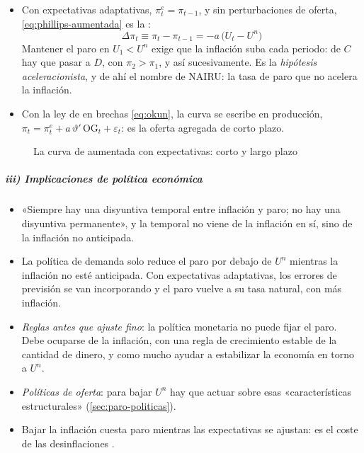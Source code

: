\documentclass[11pt]{article}
\begin{document}
\begin{itemize}
\begin{itemize}
  \item al ver que su salario real no ha subido, los trabajadores revisan sus expectativas, $\pi^e=\pi_1$, y piden más salario nominal: el salario real vuelve a su nivel y el paro, a $U^n$, con más inflación que al principio (punto $C$).
  \end{itemize}
  La curva de largo plazo, en la que $\pi=\pi^e$, es \emph{vertical} en $U^n$. Como no se puede estar en misa y repicando, a largo plazo no se tiene a la vez menos paro y la misma inflación.
\item Con expectativas adaptativas, $\pi^e_t=\pi_{t-1}$, y sin perturbaciones de oferta, \eqref{eq:phillips-aumentada} es la :
  \begin{equation}
  \Delta\pi_t\equiv\pi_t-\pi_{t-1}=-a\,\big(U_t-U^n\big) \label{eq:aceleracionista}
  \end{equation}
  Mantener el paro en $U_1<U^n$ exige que la inflación suba cada periodo: de $C$ hay que pasar a $D$, con $\pi_2>\pi_1$, y así sucesivamente. Es la \emph{hipótesis aceleracionista}, y de ahí el nombre de NAIRU: la tasa de paro que no acelera la inflación.
\item Con la ley de  en brechas \eqref{eq:okun}, la curva se escribe en producción, $\pi_t=\pi^e_t+a\,\vartheta'\,\mathrm{OG}_t+\varepsilon_t$: es la oferta agregada de corto plazo.
\end{itemize}

\begin{figure}[H]
\centering
\caption{La curva de  aumentada con expectativas: corto y largo plazo}\label{fig:phillips-aumentada}
\end{figure}

\subparagraph{iii) Implicaciones de política económica}

\begin{itemize}
\item «Siempre hay una disyuntiva temporal entre inflación y paro; no hay una disyuntiva permanente», y la temporal no viene de la inflación en sí, sino de la inflación no anticipada\nocite{Friedman1968Role}.
\item La política de demanda solo reduce el paro por debajo de $U^n$ mientras la inflación no esté anticipada. Con expectativas adaptativas, los errores de previsión se van incorporando y el paro vuelve a su tasa natural, con más inflación.
\item \emph{Reglas antes que ajuste fino}: la política monetaria no puede fijar el paro. Debe ocuparse de la inflación, con una regla de crecimiento estable de la cantidad de dinero, y como mucho ayudar a estabilizar la economía en torno a $U^n$.
\item \emph{Políticas de oferta}: para bajar $U^n$ hay que actuar sobre esas «características estructurales» (\ref{sec:paro-politicas}).
\item Bajar la inflación cuesta paro mientras las expectativas se ajustan: es el coste de las desinflaciones .
\end{itemize}
\end{document}
